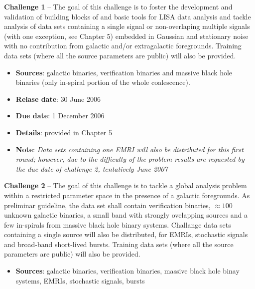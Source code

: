 \documentclass[11pt]{report}
\begin{document}
\begin{description}

\item{{\bf Challenge 1}} -- The goal of this challenge is to foster the development and validation of building blocks of and basic tools for LISA data analysis and tackle analysis of data sets containing a single signal or non-overlaping multiple signals (with one exception, see Chapter 5) embedded in Gaussian and stationary noise with no contribution from galactic and/or extragalactic foregrounds. Training data sets (where all the source parameters are public) will also be provided. 


\begin{itemize} 

\item {\bf Sources}: galactic binaries, verification binaries and massive black hole binaries (only in-spiral portion of the whole coalescence).


\item {\bf Relase date}: 30 June 2006

\item {\bf Due date}: 1 December 2006

\item {\bf Details}: provided in Chapter 5

\item {\bf Note}: {\em Data sets containing one EMRI will also be distributed for this first round; however, due to the difficulty of the problem results are requested by the due date of challenge 2, tentatively June 2007}

\end{itemize}

\item{{\bf Challenge 2}} -- The goal of this challenge is to tackle a global analysis problem within a restricted parameter space in the presence of a galactic foregrounds. As preliminar guideline, the data set shall contain verification binaries, $\approx 100$ unknown galactic binaries, a small band with strongly ovelapping sources and a few in-spirals from massive black hole binary systems. Challange data sets containing a single source will also be distributed, for EMRIs, stochastic signals and broad-band short-lived bursts. Training data sets (where all the source parameters are public) will also be provided. 

\begin{itemize}

\item {\bf Sources}: galactic binaries, verification binaries, massive black hole binay systems, EMRIs, stochastic signals, bursts



\end{itemize}
\end{description}
\end{document}
